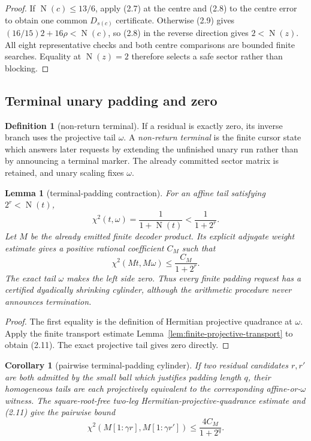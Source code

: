 \documentclass[10pt]{article}
\newtheorem{lemma}[theorem]{Lemma}
\newtheorem{corollary}[theorem]{Corollary}
\theoremstyle{definition}
\newtheorem{definition}[theorem]{Definition}
\theoremstyle{remark}
\newcommand{\Norm}{\operatorname{N}}
\newcommand{\Proj}[2]{[#1:#2]}
\begin{document}
\begin{proof}
If $\Norm(c)\le13/6$, apply (2.7) at the centre and (2.8)
to the centre error to obtain one common $D_{s(c)}$ certificate.  Otherwise
(2.9) gives $(16/15)2+16\rho<\Norm(c)$, so (2.8) in the
reverse direction gives $2<\Norm(z)$.
All eight representative checks and both centre comparisons are bounded
finite searches.  Equality at $\Norm(z)=2$ therefore selects a safe sector
rather than blocking.
\end{proof}

\subsection{Terminal unary padding and zero}

\begin{definition}[non-return terminal]
If a residual is exactly zero, its inverse branch uses the projective tail
$\omega$.  A \emph{non-return terminal} is the finite cursor state which
answers later requests by extending the unfinished unary run rather than by
announcing a terminal marker.  The already committed sector matrix is
retained, and unary scaling fixes $\omega$.
\end{definition}

\begin{lemma}[terminal-padding contraction]
\label{lem:terminal-padding}
For an affine tail satisfying $2^r<\Norm(t)$,
\[
 \chi^2(t,\omega)=\frac1{1+\Norm(t)}
 <\frac1{1+2^r}.
\tag{2.10}
\]
Let $M$ be the already emitted finite decoder product.  Its explicit adjugate weight estimate gives a positive rational coefficient $C_M$ such that
\[
 \chi^2(Mt,M\omega)\le\frac{C_M}{1+2^r}.
\tag{2.11}
\]
The exact tail $\omega$ makes the left side zero.  Thus every finite padding request has a certified dyadically shrinking cylinder, although the arithmetic procedure never announces termination.
\end{lemma}

\begin{proof}
The first equality is the definition of Hermitian projective quadrance at
$\omega$.  Apply the finite transport estimate
Lemma~\ref{lem:finite-projective-transport} to obtain (2.11).  The exact
projective tail gives zero directly.
\end{proof}

\begin{corollary}[pairwise terminal-padding cylinder]
If two residual candidates $r,r'$ are both admitted by the small
ball which justifies padding length $q$, their homogeneous tails are each
projectively equivalent to the corresponding affine-or-$\omega$ witness.
The square-root-free two-leg Hermitian-projective-quadrance estimate and
(2.11) give the pairwise
bound
\[
 \chi^2\!\left(M\Proj{1}{\gamma r},
                 M\Proj{1}{\gamma r'}\right)
 \le \frac{4C_M}{1+2^q}.
\tag{2.11a}
\]
\end{corollary}
\end{document}
